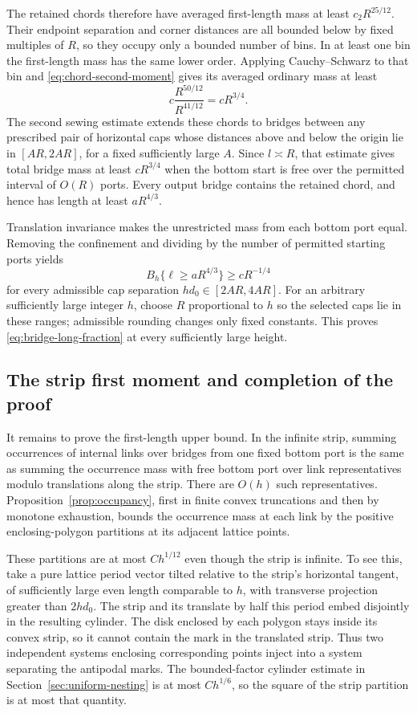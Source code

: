 The retained chords therefore have averaged first-length mass at least $c_2R^{25/12}$. Their endpoint separation and corner distances are all bounded below by fixed multiples of $R$, so they occupy only a bounded number of bins. In at least one bin the first-length mass has the same lower order. Applying Cauchy--Schwarz to that bin and \eqref{eq:chord-second-moment} gives its averaged ordinary mass at least
\[
 c\frac{R^{50/12}}{R^{41/12}}=cR^{3/4}.
\]
The second sewing estimate extends these chords to bridges between any prescribed pair of horizontal caps whose distances above and below the origin lie in $[AR,2AR]$, for a fixed sufficiently large $A$. Since $l\asymp R$, that estimate gives total bridge mass at least $cR^{3/4}$ when the bottom start is free over the permitted interval of $O(R)$ ports. Every output bridge contains the retained chord, and hence has length at least $aR^{4/3}$.

Translation invariance makes the unrestricted mass from each bottom port equal. Removing the confinement and dividing by the number of permitted starting ports yields
\[
 B_h\{\ell\ge aR^{4/3}\}\ge cR^{-1/4}
\]
for every admissible cap separation $h d_0\in[2AR,4AR]$. For an arbitrary sufficiently large integer $h$, choose $R$ proportional to $h$ so the selected caps lie in these ranges; admissible rounding changes only fixed constants. This proves \eqref{eq:bridge-long-fraction} at every sufficiently large height.

\subsection{The strip first moment and completion of the proof}

It remains to prove the first-length upper bound. In the infinite strip, summing occurrences of internal links over bridges from one fixed bottom port is the same as summing the occurrence mass with free bottom port over link representatives modulo translations along the strip. There are $O(h)$ such representatives. Proposition~\ref{prop:occupancy}, first in finite convex truncations and then by monotone exhaustion, bounds the occurrence mass at each link by the positive enclosing-polygon partitions at its adjacent lattice points.

These partitions are at most $Ch^{1/12}$ even though the strip is infinite. To see this, take a pure lattice period vector tilted relative to the strip's horizontal tangent, of sufficiently large even length comparable to $h$, with transverse projection greater than $2h d_0$. The strip and its translate by half this period embed disjointly in the resulting cylinder. The disk enclosed by each polygon stays inside its convex strip, so it cannot contain the mark in the translated strip. Thus two independent systems enclosing corresponding points inject into a system separating the antipodal marks. The bounded-factor cylinder estimate in Section~\ref{sec:uniform-nesting} is at most $Ch^{1/6}$, so the square of the strip partition is at most that quantity.

